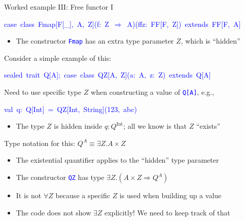 \documentclass[english,,russian]{beamer}
\newenvironment{lyxcode}
  {\par\begin{list}{}{
    \setlength{\rightmargin}{\leftmargin}
    \setlength{\listparindent}{0pt}%
    \raggedright
    \setlength{\itemsep}{0pt}
    \setlength{\parsep}{0pt}
    \normalfont\ttfamily}%
   \def\{{\char`\{}
   \def\}{\char`\}}
   \def\textasciitilde{\char`\~}
   \item[]}
  {\end{list}}
\begin{document}
\begin{frame}{Worked example III: Free functor I}
\begin{lyxcode}
\textcolor{blue}{\footnotesize{}case~class~Fmap{[}F{[}\_{]},~A,~Z{]}(f:~Z~\ensuremath{\Rightarrow}~A)(ffz:~FF{[}F,~Z{]})~extends~FF{[}F,~A{]}}{\footnotesize\par}
\end{lyxcode}
\begin{itemize}
\item {\footnotesize{}\vspace{-0.15cm}}The constructor \texttt{\textcolor{blue}{\footnotesize{}Fmap}}
has an extra type parameter $Z$, which is ``hidden''
\end{itemize}
Consider a simple example of this:
\begin{lyxcode}
\textcolor{blue}{\footnotesize{}sealed~trait~Q{[}A{]};~case~class~QZ{[}A,~Z{]}(a:~A,~z:~Z)~extends~Q{[}A{]}}{\footnotesize\par}
\end{lyxcode}
\begin{itemize}
\item Need to use specific type $Z$ when constructing a value of \texttt{\textcolor{blue}{\footnotesize{}Q{[}A{]}}},
e.g.,
\begin{lyxcode}
\textcolor{blue}{\footnotesize{}val~q:~Q{[}Int{]}~=~QZ{[}Int,~String{]}(123,~\textquotedbl abc\textquotedbl )}{\footnotesize\par}
\end{lyxcode}
\begin{itemize}
\item The type $Z$ is hidden inside $q:Q^{\text{Int}}$; all we know is
that $Z$ ``exists''
\end{itemize}
\item Type notation for this: $Q^{A}\equiv\exists Z.A\times Z$
\begin{itemize}
\item The existential quantifier applies to the ``hidden'' type parameter
\item The constructor \texttt{\textcolor{blue}{\footnotesize{}QZ}} has type
$\exists Z.\left(A\times Z\Rightarrow Q^{A}\right)$
\item It is not $\forall Z$ because a specific $Z$ is used when building
up a value
\item The code does not show $\exists Z$ explicitly! We need to keep track
of that
\end{itemize}
\end{itemize}
\end{frame}
\end{document}
